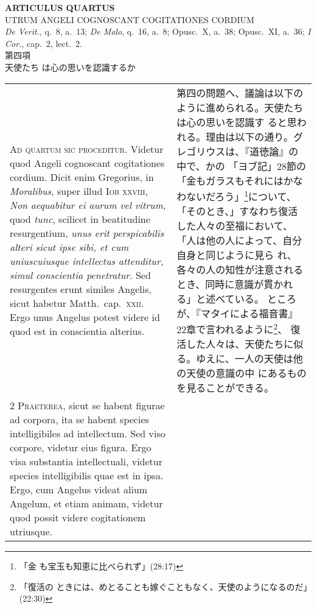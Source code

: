 \documentclass[10pt]{jsarticle} %
\begin{document}
\begin{center}
{\Large {\bf ARTICULUS QUARTUS}}\\ {\large UTRUM ANGELI COGNOSCANT
COGITATIONES CORDIUM}\\ {\footnotesize {\itshape De Verit.}, q.~8,
a.~13; {\itshape De Malo}, q.~16, a.~8; Opusc.~X, a.~38; Opusc.~XI,
a.~36; {\itshape I Cor.}, cap.~2, lect.~2.}\\ {\Large 第四項\\天使たち
は心の思いを認識するか}
\end{center}

\begin{longtable}{p{21em}p{21em}}

{\huge A}{\scshape d quartum sic proceditur}. Videtur quod Angeli
cognoscant cogitationes cordium. Dicit enim Gregorius, in {\itshape
Moralibus}, super illud {\scshape Iob} {\scshape xxviii}, {\itshape
Non aequabitur ei aurum vel vitrum}, quod {\itshape tunc}, scilicet in
beatitudine resurgentium, {\itshape unus erit perspicabilis alteri
sicut ipse sibi, et cum uniuscuiusque intellectus attenditur, simul
conscientia penetratur}. Sed resurgentes erunt similes Angelis, sicut
habetur Matth.~cap.~{\scshape xxii}. Ergo unus Angelus potest videre
id quod est in conscientia alterius.


&

第四の問題へ、議論は以下のように進められる。天使たちは心の思いを認識す
ると思われる。理由は以下の通り。グレゴリウスは、『道徳論』の中で、かの
「ヨブ記」28節の「金もガラスもそれにはかなわないだろう」\footnote{「金
も宝玉も知恵に比べられず」(28:17)}について、「そのとき、」すなわち復活
した人々の至福において、「人は他の人によって、自分自身と同じように見ら
れ、各々の人の知性が注意されるとき、同時に意識が貫かれる」と述べている。
ところが、『マタイによる福音書』22章で言われるように\footnote{「復活の
ときには、めとることも嫁ぐこともなく、天使のようになるのだ」(22:30)}、
復活した人々は、天使たちに似る。ゆえに、一人の天使は他の天使の意識の中
にあるものを見ることができる。


\\



{\scshape 2 Praeterea}, sicut se habent figurae ad corpora, ita se
habent species intelligibiles ad intellectum. Sed viso corpore,
videtur eius figura. Ergo visa substantia intellectuali, videtur
species intelligibilis quae est in ipsa. Ergo, cum Angelus videat
alium Angelum, et etiam animam, videtur quod possit videre
cogitationem utriusque.



\end{longtable}
\end{document}
